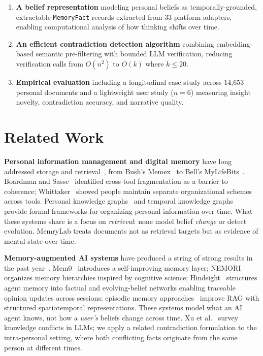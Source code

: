 \documentclass[conference]{IEEEtran}
\begin{document}
\begin{enumerate}
    \item \textbf{A belief representation} modeling personal beliefs as temporally-grounded, extractable \texttt{MemoryFact} records extracted from 33 platform adapters, enabling computational analysis of how thinking shifts over time.
    \item \textbf{An efficient contradiction detection algorithm} combining embedding-based semantic pre-filtering with bounded LLM verification, reducing verification calls from $O(n^2)$ to $O(k)$ where $k \leq 20$.
    \item \textbf{Empirical evaluation} including a longitudinal case study across 14,653 personal documents and a lightweight user study ($n{=}6$) measuring insight novelty, contradiction accuracy, and narrative quality.
\end{enumerate}

\section{Related Work}
\label{sec:related}

\textbf{Personal information management and digital memory} have long addressed storage and retrieval~\cite{jones2007pim,lansdale1988psychology}, from Bush's Memex~\cite{bush1945memex} to Bell's MyLifeBits~\cite{gemmell2002mylifebits,bell2009total}. Boardman and Sasse~\cite{boardman2004stuff} identified cross-tool fragmentation as a barrier to coherence; Whittaker~\cite{whittaker2011personal} showed people maintain separate organizational schemes across tools. Personal knowledge graphs~\cite{balog2019personal,kejriwal2021knowledge} and temporal knowledge graphs~\cite{cai2024tkg_survey,leblay2018temporal} provide formal frameworks for organizing personal information over time. What these systems share is a focus on \emph{retrieval}: none model belief \emph{change} or detect evolution. MemryLab treats documents not as retrieval targets but as evidence of mental state over time.

\textbf{Memory-augmented AI systems} have produced a string of strong results in the past year~\cite{chhikara2025mem0,qian2025memorag,nan2025nemori}. Mem0~\cite{chhikara2025mem0} introduces a self-improving memory layer; NEMORI~\cite{nan2025nemori} organizes memory hierarchies inspired by cognitive science; Hindsight~\cite{latimer2025hindsight} structures agent memory into factual and evolving-belief networks enabling traceable opinion updates across sessions; episodic memory approaches~\cite{rajesh2025episodic} improve RAG with structured spatiotemporal representations. These systems model what an AI agent knows, not how a \emph{user's} beliefs change across time. Xu et al.~\cite{xu2024knowledge} survey knowledge conflicts in LLMs; we apply a related contradiction formulation to the intra-personal setting, where both conflicting facts originate from the same person at different times.
\end{document}
